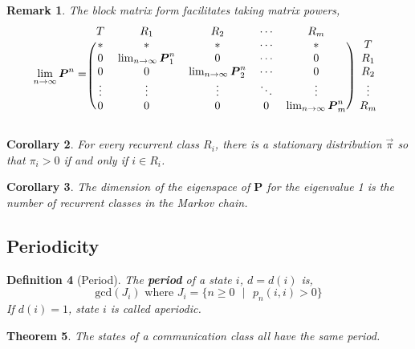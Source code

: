 \documentclass{tufte-handout}
\newtheorem{thm}{Theorem}
\newtheorem{cor}[thm]{Corollary}
\newtheorem{defn}[thm]{Definition}
\newtheorem{rmk}[thm]{Remark}
\begin{document}
    \begin{rmk}
      The block matrix form facilitates taking matrix powers,
          \[
          \lim_{n \rightarrow \infty} \boldsymbol{P}^n = \begin{blockarray}{cccccc}
          T & R_1 & R_2 & \cdots & R_m \\
          \begin{block}{(ccccc)c}
            * & * & * & \cdots & * & T \\
            0 & \lim_{n \rightarrow \infty} \boldsymbol{P}^n_1 & 0 & \cdots & 0 & R_1 \\
            0 & 0 & \lim_{n \rightarrow \infty} \boldsymbol{P}^n_2 & \cdots & 0 & R_2 \\
            \vdots & \vdots & \vdots & \ddots &  \vdots & \vdots \\
            0 & 0 & 0 & 0 & \lim_{n \rightarrow \infty} \boldsymbol{P}^n_m & R_m \\
          \end{block}
          \end{blockarray}
           \]
    \end{rmk}
    
    \begin{cor}
    For every recurrent class $R_i$, there is a stationary distribution $\Vec{\pi}$ so that $\pi_i>0$ if and only if $i\in R_i$.
    \end{cor}

    \begin{cor}
    The dimension of the eigenspace of $\boldsymbol{P}$ for the eigenvalue 1 is the number of recurrent classes in the Markov chain.
    \end{cor}

  \subsection{Periodicity}
  \begin{defn}[Period]
    The \textbf{period} of a state $i$, $d = d(i)$ is,
    \[\text{gcd}(J_i) \text{ where } J_i = \{n \geq 0 \text{ $|$ } p_n(i,i) > 0\}\]
    \noindent If $d(i) = 1$, state $i$ is called aperiodic.
  \end{defn}

  \begin{thm}
    The states of a communication class all have the same period.
  \end{thm}
\end{document}
